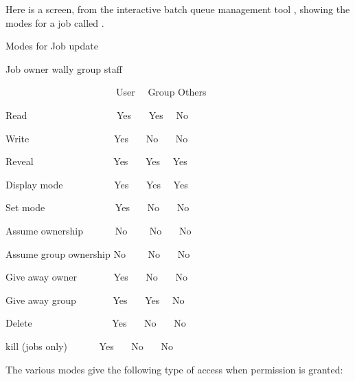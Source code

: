Here is a screen, from the interactive batch queue management tool \PrBtq{}, showing the modes for a job called .

\begin{expara}

Modes for Job {\textasciigrave}update{\textquotesingle}

Job owner wally group staff

\bigskip

\ \ \ \ \ \ \ \ \ \ \ \ \ \ \ \ \ \ \ \ \ \ \ User \ \ Group Others

Read \ \ \ \ \ \ \ \ \ \ \ \ \ \ \ \ \ \ Yes \ \ \ Yes \ \ No

Write \ \ \ \ \ \ \ \ \ \ \ \ \ \ \ \ \ Yes \ \ \ No \ \ \ No

Reveal \ \ \ \ \ \ \ \ \ \ \ \ \ \ \ \ Yes \ \ \ Yes \ \ Yes

Display mode \ \ \ \ \ \ \ \ \ \ Yes \ \ \ Yes \ \ Yes

Set mode \ \ \ \ \ \ \ \ \ \ \ \ \ \ Yes \ \ \ No \ \ \ No

Assume ownership \ \ \ \ \ \ No \ \ \ \ No \ \ \ No

Assume group ownership No \ \ \ \ No \ \ \ No

Give away owner \ \ \ \ \ \ \ Yes \ \ \ No \ \ \ No

Give away group \ \ \ \ \ \ \ Yes \ \ \ Yes \ \ No

Delete \ \ \ \ \ \ \ \ \ \ \ \ \ \ \ \ Yes \ \ \ No \ \ \ No

kill (jobs only) \ \ \ \ \ \ Yes \ \ \ No \ \ \ No

\end{expara}

The various modes give the following type of access when permission is granted:

